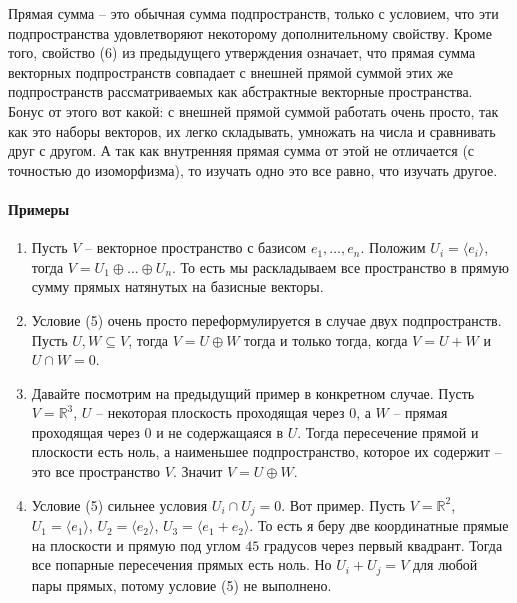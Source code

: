 Прямая сумма -- это обычная сумма подпространств, только с условием, что эти подпространства удовлетворяют некоторому дополнительному свойству.
Кроме того, свойство (6) из предыдущего утверждения означает, что прямая сумма векторных подпространств совпадает с внешней прямой суммой этих же подпространств рассматриваемых как абстрактные векторные пространства.
Бонус от этого вот какой: с внешней прямой суммой работать очень просто, так как это наборы векторов, их легко складывать, умножать на числа и сравнивать друг с другом.
А так как внутренняя прямая сумма от этой не отличается (с точностью до изоморфизма), то изучать одно это все равно, что изучать другое.

\paragraph{Примеры}

\begin{enumerate}
\item Пусть $V$ -- векторное пространство с базисом $e_1,\ldots,e_n$.
Положим $U_i = \langle e_i \rangle$, тогда $V = U_1 \oplus \ldots \oplus U_n$.
То есть мы раскладываем все пространство в прямую сумму прямых натянутых на базисные векторы.

\item Условие (5) очень просто переформулируется в случае двух подпространств.
Пусть $U, W\subseteq V$, тогда $V = U \oplus W$ тогда и только тогда, когда $V = U + W$ и $U \cap W = 0$.

\item Давайте посмотрим на предыдущий пример в конкретном случае.
Пусть $V=\mathbb R^3$, $U$ -- некоторая плоскость проходящая через $0$, а $W$ -- прямая проходящая через $0$ и не содержащаяся в $U$.
Тогда пересечение прямой и плоскости есть ноль, а наименьшее подпространство, которое их содержит -- это все пространство $V$.
Значит $V = U \oplus W$.

\item Условие (5) сильнее условия $U_i \cap U_j = 0$.
Вот пример.
Пусть $V = \mathbb R^2$, $U_1 = \langle e_1\rangle$, $U_2 = \langle e_2\rangle$, $U_3 = \langle e_1 + e_2\rangle$.
То есть я беру две координатные прямые на плоскости и прямую под углом $45$ градусов через первый квадрант.
Тогда все попарные пересечения прямых есть ноль.
Но $U_i + U_j = V$ для любой пары прямых, потому условие (5) не выполнено.
\end{enumerate}
